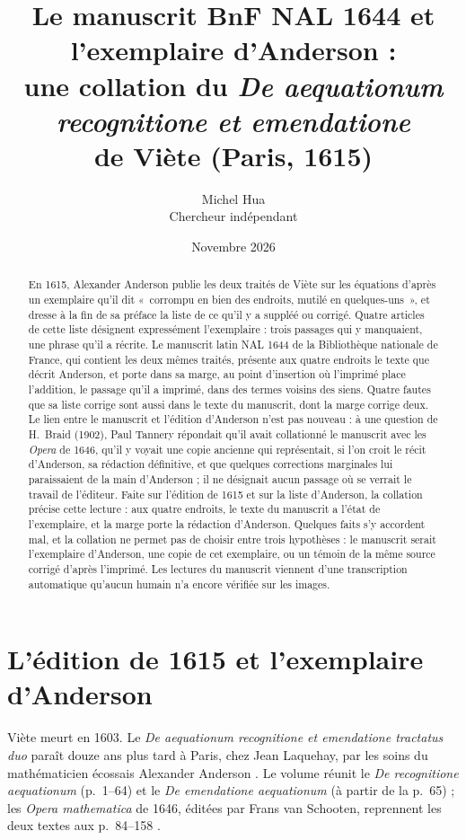 \documentclass[11pt,a4paper]{article}
\title{Le manuscrit BnF NAL 1644 et l'exemplaire d'Anderson :\\
une collation du \emph{De aequationum recognitione et emendatione}\\
de Viète (Paris, 1615)}
\author{Michel Hua\\\small Chercheur indépendant}
\date{Novembre 2026}
\theoremstyle{remark}
\begin{document}
\maketitle

\begin{abstract}
En 1615, Alexander Anderson publie les deux traités de Viète sur les
équations d'après un exemplaire qu'il dit «~corrompu en bien des endroits,
mutilé en quelques-uns~», et dresse à la fin de sa préface la liste de ce
qu'il y a suppléé ou corrigé. Quatre articles de cette liste désignent
expressément l'exemplaire : trois passages qui y manquaient, une phrase qu'il
a récrite. Le manuscrit latin NAL 1644 de la Bibliothèque nationale de
France, qui contient les deux mêmes traités, présente aux quatre endroits le
texte que décrit Anderson, et porte dans sa marge, au point d'insertion où
l'imprimé place l'addition, le passage qu'il a imprimé, dans des termes
voisins des siens. Quatre fautes que sa liste corrige sont aussi dans le texte
du manuscrit, dont la marge corrige deux. Le lien entre le manuscrit et
l'édition d'Anderson n'est pas nouveau : à une question de H.~Braid (1902),
Paul Tannery répondait qu'il avait collationné le manuscrit avec les
\emph{Opera} de 1646, qu'il y voyait une copie ancienne qui représentait, si
l'on croit le récit d'Anderson, sa rédaction définitive, et que quelques
corrections marginales lui paraissaient de la main d'Anderson ; il ne
désignait aucun passage où se verrait le travail de l'éditeur. Faite sur
l'édition de 1615 et sur la liste d'Anderson, la collation précise cette
lecture : aux quatre endroits, le texte du manuscrit a l'état de
l'exemplaire, et la marge porte la rédaction d'Anderson. Quelques faits
s'y accordent mal, et la collation ne permet pas de choisir entre trois
hypothèses : le manuscrit serait l'exemplaire d'Anderson, une copie de cet
exemplaire, ou un témoin de la même source corrigé d'après l'imprimé. Les lectures du manuscrit
viennent d'une transcription automatique qu'aucun humain n'a encore
vérifiée sur les images.
\end{abstract}

\section{L'édition de 1615 et l'exemplaire d'Anderson}\label{sec:anderson}

Viète meurt en 1603. Le \emph{De aequationum recognitione et emendatione
tractatus duo} paraît douze ans plus tard à Paris, chez Jean Laquehay, par
les soins du mathématicien écossais Alexander Anderson
\cite{anderson1615}. Le volume réunit le \emph{De recognitione aequationum}
(p.~1--64) et le \emph{De emendatione aequationum} (à partir de la p.~65) ;
les \emph{Opera mathematica} de 1646, éditées par Frans van Schooten,
reprennent les deux textes aux p.~84--158 \cite{opera1646}.
\end{document}
